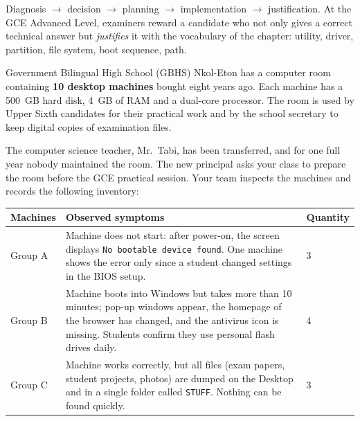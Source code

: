 \documentclass[11pt]{article}
\newcounter{popsec}
\newcounter{popsub}
\newcommand{\courssub}[1]{%
  \stepcounter{popsub}%
  \par\vspace{9pt}\noindent{\popxbold\fontsize{11.5}{13}\selectfont\color{popink}{\color{poporange}\thepopsec.\thepopsub}\hspace{6pt}#1}\par\nopagebreak\vspace{4pt}
}
\begin{document}
\begin{aretenir}
Diagnosis $\rightarrow$ decision $\rightarrow$ planning $\rightarrow$ implementation $\rightarrow$ justification. At the GCE Advanced Level, examiners reward a candidate who not only gives a correct technical answer but \emph{justifies} it with the vocabulary of the chapter: utility, driver, partition, file system, boot sequence, path.
\end{aretenir}

\courssub{Situation}

\begin{experience}
Government Bilingual High School (GBHS) Nkol-Eton has a computer room containing \textbf{10 desktop machines} bought eight years ago. Each machine has a 500~GB hard disk, 4~GB of RAM and a dual-core processor. The room is used by Upper Sixth candidates for their practical work and by the school secretary to keep digital copies of examination files.

The computer science teacher, Mr.\ Tabi, has been transferred, and for one full year nobody maintained the room. The new principal asks your class to prepare the room before the GCE practical session. Your team inspects the machines and records the following inventory:

\begin{center}
\begin{tabularx}{\linewidth}{|l|X|l|}
\hline
\rowcolor{popblueL} \textbf{Machines} & \textbf{Observed symptoms} & \textbf{Quantity} \\
\hline
Group A & Machine does not start: after power-on, the screen displays \texttt{No bootable device found}. One machine shows the error only since a student changed settings in the BIOS setup. & 3 \\
\hline
Group B & Machine boots into Windows but takes more than 10 minutes; pop-up windows appear, the homepage of the browser has changed, and the antivirus icon is missing. Students confirm they use personal flash drives daily. & 4 \\
\hline
Group C & Machine works correctly, but all files (exam papers, student projects, photos) are dumped on the Desktop and in a single folder called \texttt{STUFF}. Nothing can be found quickly. & 3 \\
\hline
\end{tabularx}
\end{center}


\end{experience}
\end{document}
